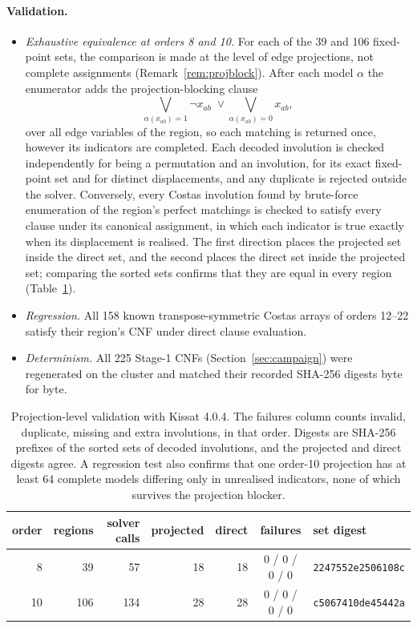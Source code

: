 \documentclass[11pt,a4paper]{article}
\theoremstyle{definition}
\begin{document}
\paragraph{Validation.}
\begin{itemize}
\item \emph{Exhaustive equivalence at orders 8 and 10.} For each of the 39 and 106 fixed-point
sets, the comparison is made at the level of edge projections, not complete assignments
(Remark~\ref{rem:projblock}). After each model $\alpha$ the enumerator adds the
projection-blocking clause
\[
\bigvee_{\alpha(x_{ab})=1}\neg x_{ab}\;\vee\bigvee_{\alpha(x_{ab})=0}x_{ab},
\]
over all edge variables of the region, so each matching is returned once, however its indicators
are completed. Each decoded involution is checked independently for being a permutation and an
involution, for its exact fixed-point set and for distinct displacements, and any duplicate is
rejected outside the solver. Conversely, every Costas involution found by brute-force enumeration of
the region's perfect matchings is checked to satisfy every clause under its canonical assignment, in
which each indicator is true exactly when its displacement is realised. The first direction places
the projected set inside the direct set, and the second places the direct set inside the projected
set; comparing the sorted sets confirms that they are equal in every region
(Table~\ref{tab:projval}).
\item \emph{Regression.} All 158 known transpose-symmetric Costas arrays of orders 12--22
satisfy their region's CNF under direct clause evaluation.
\item \emph{Determinism.} All 225 Stage-1 CNFs (Section~\ref{sec:campaign}) were regenerated
on the cluster and matched their recorded SHA-256 digests byte for byte.
\end{itemize}

\begin{table}[H]
\centering
\small
\begin{tabular}{@{}rrrrrcl@{}}
\toprule
order & regions & solver calls & projected & direct & failures & set digest \\
\midrule
8 & 39 & 57 & 18 & 18 & 0 / 0 / 0 / 0 & \texttt{2247552e2506108c} \\
10 & 106 & 134 & 28 & 28 & 0 / 0 / 0 / 0 & \texttt{c5067410de45442a} \\
\bottomrule
\end{tabular}
\caption{Projection-level validation with Kissat 4.0.4. The failures column counts invalid,
duplicate, missing and extra involutions, in that order. Digests are SHA-256 prefixes of the sorted
sets of decoded involutions, and the projected and direct digests agree. A regression test also
confirms that one order-10 projection has at least 64 complete models differing only in unrealised
indicators, none of which survives the projection blocker.}
\label{tab:projval}
\end{table}
\end{document}
